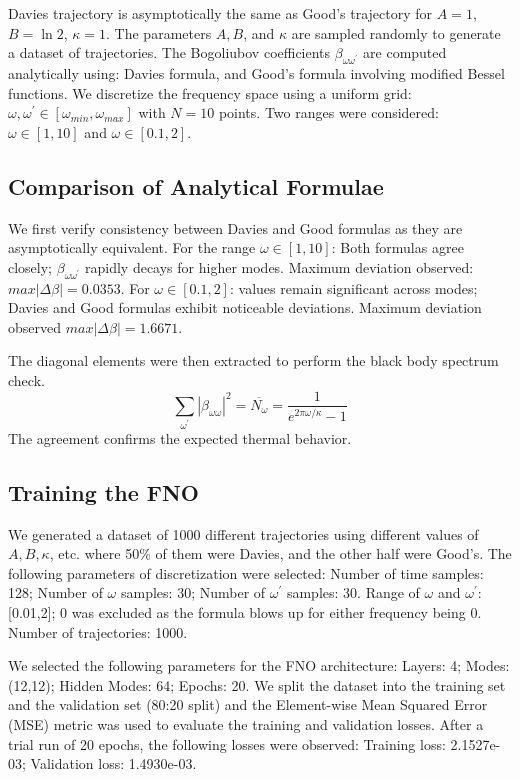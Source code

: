 Davies trajectory is asymptotically the same as Good's trajectory for $A=1$, $B=\ln 2$, $\kappa=1$. The parameters $A, B$, and $\kappa$ are sampled randomly to generate a dataset of trajectories. The Bogoliubov coefficients $\beta_{\omega\omega^{\prime}}$ are computed analytically using: Davies formula, and Good's formula involving modified Bessel functions. We discretize the frequency space using a uniform grid: $\omega,\omega^{\prime}\in[\omega_{min},\omega_{max}]$ with $N=10$ points. Two ranges were considered: $\omega\in[1,10]$ and $\omega\in[0.1,2]$. 

\subsection{Comparison of Analytical Formulae}
We first verify consistency between Davies and Good formulas as they are asymptotically equivalent. For the range $\omega\in[1,10]$: Both formulas agree closely; $\beta_{\omega\omega^{\prime}}$ rapidly decays for higher modes. Maximum deviation observed: $max|\Delta\beta|=0.0353$. For $\omega\in[0.1,2]$: values remain significant across modes; Davies and Good formulas exhibit noticeable deviations. Maximum deviation observed $max|\Delta\beta|=1.6671$. 

The diagonal elements were then extracted to perform the black body spectrum check. 
\begin{equation}
\sum_{\omega^{\prime}}|\beta_{\omega\omega}|^{2}=\overline{N_{\omega}}=\frac{1}{e^{2\pi\omega/\kappa}-1}
\end{equation}
The agreement confirms the expected thermal behavior. 

\subsection{Training the FNO}
We generated a dataset of 1000 different trajectories using different values of $A, B, \kappa$, etc. where 50\% of them were Davies, and the other half were Good's. The following parameters of discretization were selected: Number of time samples: 128; Number of $\omega$ samples: 30; Number of $\omega^{\prime}$ samples: 30. Range of $\omega$ and $\omega^{\prime}$: [0.01,2]; 0 was excluded as the formula blows up for either frequency being 0. Number of trajectories: 1000. 

We selected the following parameters for the FNO architecture: Layers: 4; Modes: (12,12); Hidden Modes: 64; Epochs: 20. We split the dataset into the training set and the validation set (80:20 split) and the Element-wise Mean Squared Error (MSE) metric was used to evaluate the training and validation losses. After a trial run of 20 epochs, the following losses were observed: Training loss: 2.1527e-03; Validation loss: 1.4930e-03. 

